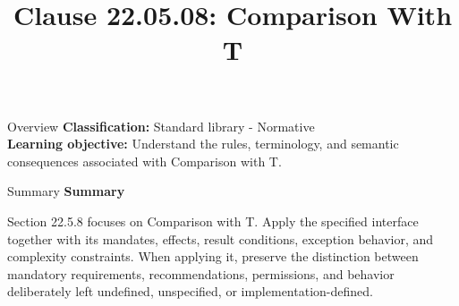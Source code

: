 \documentclass[10pt,letterpaper]{article}
\title{Clause 22.05.08: Comparison With T}
\author{}
\date{}
\begin{document}
\maketitle
\begin{CornellOverviewBox}{Overview}
\textbf{Classification:} Standard library - Normative\\[2pt]
\textbf{Learning objective:} Understand the rules, terminology, and semantic consequences associated with Comparison with T.
\end{CornellOverviewBox}\begin{CornellSummaryBox}{Summary}
{\sffamily\bfseries\color{Accent} Summary}\par\vspace{3pt}Section 22.5.8 focuses on Comparison with T. Apply the specified interface together with its mandates, effects, result conditions, exception behavior, and complexity constraints. When applying it, preserve the distinction between mandatory requirements, recommendations, permissions, and behavior deliberately left undefined, unspecified, or implementation-defined.
\end{CornellSummaryBox}
\end{document}
